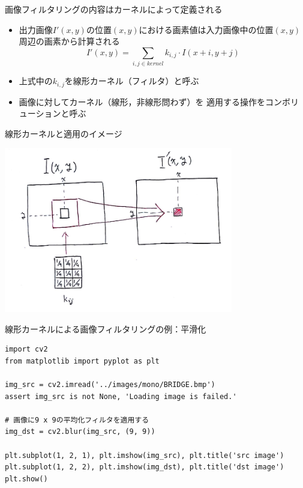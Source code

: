 \documentclass[10pt]{beamer}
\newcommand{\mymain}[1]{\textcolor{mLightBrown}{#1}}
\begin{document}
	\begin{frame}{画像フィルタリングの内容はカーネルによって定義される}
		\begin{itemize}
			\item 出力画像$I'(x, y)$の位置$(x, y)$における画素値は入力画像中の位置$(x, y)$周辺の画素から計算される
			\[ I'(x, y) = \sum_{i, j \in \mathit{kernel}} k_{i, j} \cdot I(x + i, y + j) \]
			\item 上式中の$k_{i, j}$を\mymain{線形カーネル（フィルタ）}と呼ぶ
			\item 画像に対してカーネル（線形，非線形問わず）を
				適用する操作を\mymain{コンボリューション}と呼ぶ
		\end{itemize}
	\end{frame}

	\begin{frame}{線形カーネルと適用のイメージ}
		\begin{center}
	        \includegraphics[width=10cm]{figs/linear_filtering.png}
	    \end{center}
	\end{frame}

	\begin{frame}[fragile]{線形カーネルによる画像フィルタリングの例：平滑化}
		\scriptsize
		\begin{verbatim}
import cv2
from matplotlib import pyplot as plt

img_src = cv2.imread('../images/mono/BRIDGE.bmp')
assert img_src is not None, 'Loading image is failed.'

# 画像に9 x 9の平均化フィルタを適用する
img_dst = cv2.blur(img_src, (9, 9))

plt.subplot(1, 2, 1), plt.imshow(img_src), plt.title('src image')
plt.subplot(1, 2, 2), plt.imshow(img_dst), plt.title('dst image')
plt.show()
		\end{verbatim}
	\end{frame}
	
\end{document}
